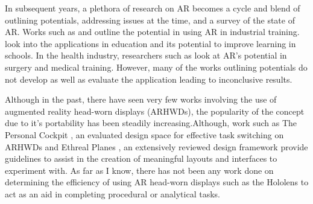 In subsequent years, a plethora of research on AR becomes a cycle and blend of outlining potentials, addressing issues at the time, and a survey of the state of AR. Works such as \cite{Zhong2003} and \cite{Boulanger2004} outline the potential in using AR in industrial training. \cite{Bower2014} look into the applications in education and its potential to improve learning in schools. In the health industry, researchers such as \cite{Barsom2016, Chan2017, Chen2015, Okamoto2015} look at AR's potential in surgery and medical training. However, many of the works outlining potentials do not develop as well as evaluate the application leading to inconclusive results.

Although in the past, there have seen very few works involving the use of augmented reality head-worn displays (ARHWDs), the popularity of the concept due to it's portability has been steadily increasing.Although, work such as The Personal Cockpit \cite{Ens2014}, an evaluated design space for effective task switching on ARHWDs and Ethreal Planes \cite{Ens2014a}, an extensively reviewed design framework provide guidelines to assist in the creation of meaningful layouts and interfaces to experiment with. As far as I know, there has not been any work done on determining the efficiency of using AR head-worn displays such as the Hololens to act as an aid in completing procedural or analytical tasks. 

